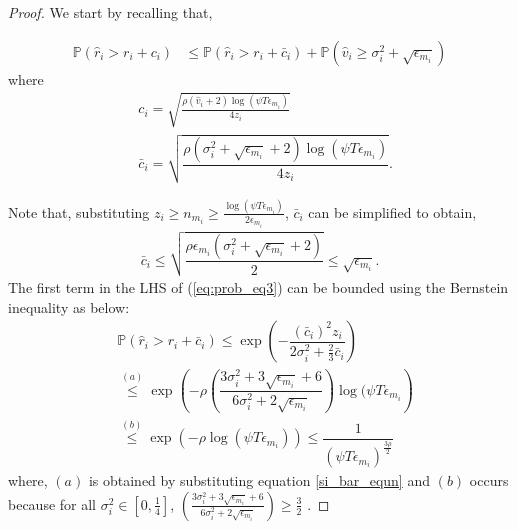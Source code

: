 \begin{proof}

We start by recalling that,

\begin{align}
\mathbb{P}(\hat{r}_{i}> r_{i} + c_{i})
&\leq \mathbb{P}\left( \hat{r}_{i} > r_{i}+ \bar{c}_i\right) 
+ \mathbb{P}\left( \hat{v}_{i}\geq \sigma_{i}^{2}+\sqrt{\epsilon_{m_{i}}}\right)\label{eq:prob_eq3}
\end{align}
where 
\begin{align*}
&c_i =\sqrt{\frac{\rho (\hat{v}_i + 2)\log (\psi T\epsilon_{m_{i}})}{4 z_i}} \\
&\bar{c}_i=\sqrt{\dfrac{\rho (\sigma_{i}^{2}+\sqrt{\epsilon_{m_{i}}} + 2)\log(\psi T\epsilon_{m_{i}})}{4 z_i}}.
\end{align*}

Note that, substituting $ z_i \geq n_{m_i} \geq \frac{\log{(\psi T\epsilon_{m_{i}})}}{2\epsilon_{m_{i}}}$, $\bar{c}_i$ can be simplified to obtain,
\begin{align}
\bar{c}_i
\leq \sqrt{\dfrac{\rho\epsilon_{m_{i}}(\sigma_{i}^{2}+\sqrt{\epsilon_{m_{i}}} + 2)}{2}}\leq \sqrt{ \epsilon_{m_{i}}}.
\label{si_bar_equn}
\end{align}
%
The first term in the LHS of (\ref{eq:prob_eq3}) can be bounded using the Bernstein inequality as below:
\begin{align}
&\mathbb{P}\left( \hat{r}_{i} > r_{i}+ \bar{c}_i\right)\nonumber 
\le \exp\left(- \dfrac{(\bar{c}_i)^2 z_{i}}{2\sigma_i^2 + \frac{2}{3}\bar{c}_i} \right)\nonumber 
\\
& \overset{(a)}{\le} \exp\left(- \rho \left(\dfrac{3\sigma_{i}^{2}+3\sqrt{\epsilon_{m_{i}}} + 6}{6\sigma_i^2 + 2\sqrt{\epsilon_{m_i}}} \right)\log(\psi  T\epsilon_{m_{i}}\right)\nonumber \\
& \overset{(b)}{\leq} \exp\left(- \rho \log(\psi  T\epsilon_{m_{i}})\right) 
\le \dfrac{1}{(\psi  T\epsilon_{m_{i}})^{\frac{3\rho}{2}}}
\label{lhs1_equn}
\end{align}
where, $(a)$ is obtained by substituting equation \ref{si_bar_equn} and $(b)$ occurs because for all $\sigma_{i}^2 \in [0,\frac{1}{4}]$, $\left(\frac{3\sigma_{i}^{2}+3\sqrt{\epsilon_{m_{i}}} + 6}{6\sigma_i^2 + 2\sqrt{\epsilon_{m_i}}}\right) \geq \frac{3}{2}$ .


\end{proof}
